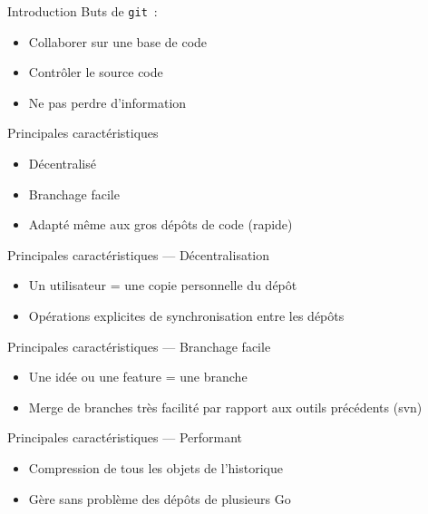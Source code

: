 \begin{frame}{Introduction}
  Buts de \texttt{git}~:
  \begin{itemize}[<+->]
    \item Collaborer sur une base de code
    \item Contrôler le source code
    \item Ne pas perdre d'information
  \end{itemize}
\end{frame}

\begin{frame}{Principales caractéristiques}
  \begin{itemize}[<+->]
    \item Décentralisé
    \item Branchage facile
    \item Adapté même aux gros dépôts de code (rapide)
  \end{itemize}
\end{frame}

\begin{frame}{Principales caractéristiques --- Décentralisation}
  \begin{itemize}[<+->]
    \item Un utilisateur = une copie personnelle du dépôt
    \item Opérations explicites de synchronisation entre les dépôts
  \end{itemize}
\end{frame}

\begin{frame}{Principales caractéristiques --- Branchage facile}
  \begin{itemize}[<+->]
    \item Une idée ou une feature = une branche
    \item Merge de branches très facilité par rapport aux outils précédents (svn)
  \end{itemize}
\end{frame}

\begin{frame}{Principales caractéristiques --- Performant}
  \begin{itemize}[<+->]
    \item Compression de tous les objets de l'historique
    \item Gère sans problème des dépôts de plusieurs Go
  \end{itemize}
\end{frame}

